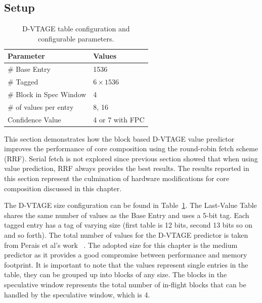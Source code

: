 \subsection{Setup}

\begin{table}[t]
\small
\centering
\begin{tabular}{p{5.2cm} p{3cm}}
\toprule
\textbf{Parameter} & \textbf{Values} \\ \midrule
\# Base Entry & 1536\\
\# Tagged & $6\times1536$\\
\# Block in Spec Window & 4 \\ \hline \midrule
\# of values per entry & 8, 16\\
Confidence Value & 4 or 7 with FPC \\ \bottomrule
\end{tabular}
  \caption{D-VTAGE table configuration and configurable parameters.}\label{tab:vtage-conf}
\vspace{1em}
\end{table}

This section demonstrates how the block based D-VTAGE value predictor improves the performance of core composition using the round-robin fetch scheme (RRF).
Serial fetch is not explored since previous section showed that when using value prediction, RRF always provides the best results.
The results reported in this section represent the culmination of hardware modifications for core composition discussed in this chapter.

The D-VTAGE size configuration can be found in Table~\ref{tab:vtage-conf}.
The Last-Value Table shares the same number of values as the Base Entry and uses a 5-bit tag.
Each tagged entry has a tag of varying size (first table is 12 bits, second 13 bits so on and so forth).
The total number of values for the D-VTAGE predictor is taken from Perais et al's work ~\cite{peraisBeBop2015}.
The adopted size for this chapter is the medium predictor as it provides a good compromise between performance and memory footprint.
It is important to note that the values represent single entries in the table, they can be grouped up into blocks of any size.
The blocks in the speculative window represents the total number of in-flight blocks that can be handled by the speculative window, which is 4.

